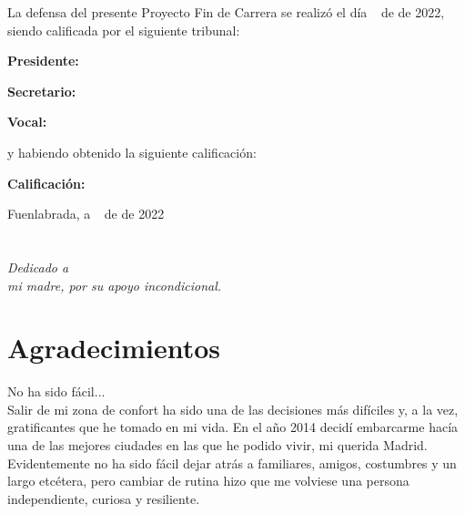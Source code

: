 \documentclass[a4paper, 12pt]{book}
\begin{document}
\vspace{1cm}
La defensa del presente Proyecto Fin de Carrera se realizó el día \qquad$\;\,$ de \qquad\qquad\qquad\qquad \newline de 2022, siendo calificada por el siguiente tribunal:


\vspace{0.5cm}
\textbf{Presidente:}

\vspace{1.2cm}
\textbf{Secretario:}

\vspace{1.2cm}
\textbf{Vocal:}



\vspace{1.2cm}
y habiendo obtenido la siguiente calificación:

\vspace{1cm}
\textbf{Calificación:}


\vspace{1cm}
\begin{flushright}
Fuenlabrada, a \qquad$\;\,$ de \qquad\qquad\qquad\qquad de 2022
\end{flushright}


\chapter*{}
\begin{flushright}
\textit{Dedicado a \\
mi madre, por su apoyo incondicional.}
\end{flushright}


\chapter*{Agradecimientos}
No ha sido fácil...\\

Salir de mi zona de confort ha sido una de las decisiones más difíciles y, a la vez, gratificantes que he tomado en mi vida. En el año 2014 decidí embarcarme hacía una de las mejores ciudades en las que he podido vivir, mi querida Madrid. Evidentemente no ha sido fácil dejar atrás a familiares, amigos, costumbres y un largo etcétera, pero cambiar de rutina hizo que me volviese una persona independiente, curiosa y resiliente. 
\end{document}
